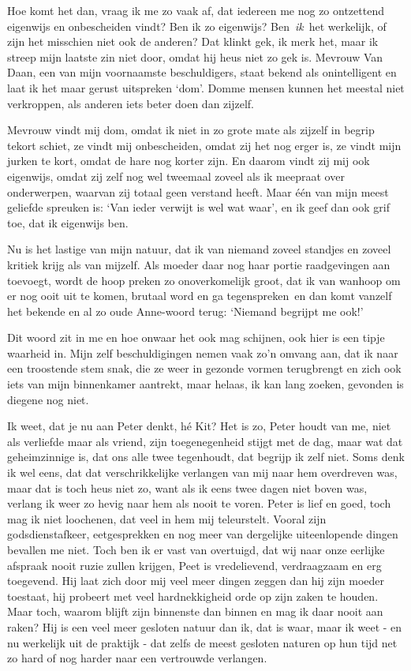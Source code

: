 \documentclass{book}
\begin{document}
Hoe komt het dan, vraag ik me zo vaak af, dat iedereen me nog zo
ontzettend eigenwijs en onbescheiden vindt? Ben ik zo eigenwijs?
Ben~\emph{ik}~het werkelijk, of zijn het misschien niet ook de anderen?
Dat klinkt gek, ik merk het, maar ik streep mijn laatste zin niet door,
omdat hij heus niet zo gek is. Mevrouw Van Daan, een van mijn
voornaamste beschuldigers, staat bekend als onintelligent en laat ik het
maar gerust uitspreken `dom'. Domme mensen kunnen het meestal niet
verkroppen, als anderen iets beter doen dan zijzelf.

Mevrouw vindt mij dom, omdat ik niet in zo grote mate als zijzelf in
begrip tekort schiet, ze vindt mij onbescheiden, omdat zij het nog erger
is, ze vindt mijn jurken te kort, omdat de hare nog korter zijn. En
daarom vindt zij mij ook eigenwijs, omdat zij zelf nog wel tweemaal
zoveel als ik meepraat over onderwerpen, waarvan zij totaal geen
verstand heeft. Maar één van mijn meest geliefde spreuken is: `Van ieder
verwijt is wel wat waar', en ik geef dan ook grif toe, dat ik eigenwijs
ben.

Nu is het lastige van mijn natuur, dat ik van niemand zoveel standjes en
zoveel kritiek krijg als van mijzelf. Als moeder daar nog haar portie
raadgevingen aan toevoegt, wordt de hoop preken zo onoverkomelijk groot,
dat ik van wanhoop om er nog ooit uit te komen, brutaal word en ga
tegenspreken~en dan komt vanzelf het bekende en al zo oude Anne-woord
terug: `Niemand begrijpt me ook!'

Dit woord zit in me en hoe onwaar het ook mag schijnen, ook hier is een
tipje waarheid in. Mijn zelf beschuldigingen nemen vaak zo'n omvang aan,
dat ik naar een troostende stem snak, die ze weer in gezonde vormen
terugbrengt en zich ook iets van mijn binnenkamer aantrekt, maar helaas,
ik kan lang zoeken, gevonden is diegene nog niet.

Ik weet, dat je nu aan Peter denkt, hé Kit? Het is zo, Peter houdt van
me, niet als verliefde maar als vriend, zijn toegenegenheid stijgt met
de dag, maar wat dat geheimzinnige is, dat ons alle twee tegenhoudt, dat
begrijp ik zelf niet. Soms denk ik wel eens, dat dat verschrikkelijke
verlangen van mij naar hem overdreven was, maar dat is toch heus niet
zo, want als ik eens twee dagen niet boven was, verlang ik weer zo hevig
naar hem als nooit te voren. Peter is lief en goed, toch mag ik niet
loochenen, dat veel in hem mij teleurstelt. Vooral zijn
godsdienstafkeer, eetgesprekken en nog meer van dergelijke uiteenlopende
dingen bevallen me niet. Toch ben ik er vast van overtuigd, dat wij naar
onze eerlijke afspraak nooit ruzie zullen krijgen, Peet is vredelievend,
verdraagzaam en erg toegevend. Hij laat zich door mij veel meer dingen
zeggen dan hij zijn moeder toestaat, hij probeert met veel
hardnekkigheid orde op zijn zaken te houden. Maar toch, waarom blijft
zijn binnenste dan binnen en mag ik daar nooit aan raken? Hij is een
veel meer gesloten natuur dan ik, dat is waar, maar ik weet - en nu
werkelijk uit de praktijk - dat zelfs de meest gesloten naturen op hun
tijd net zo hard of nog harder naar een vertrouwde verlangen.
\end{document}
